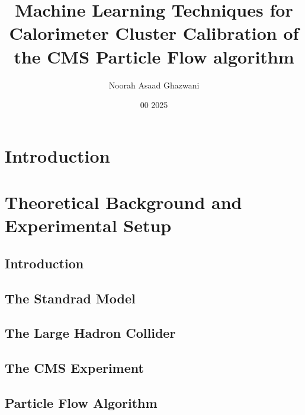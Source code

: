 \documentclass
[
]
{thesis}
\title{Machine Learning Techniques for Calorimeter Cluster Calibration of the CMS Particle Flow algorithm}
\author{Noorah Asaad Ghazwani}
\date{00 2025}
\begin{document}

\setlength{\belowdisplayskip}{1ex} \setlength{\belowdisplayshortskip}{1ex}
\setlength{\abovedisplayskip}{1ex} \setlength{\abovedisplayshortskip}{1ex}


\chapter{Introduction}


\chapter{Theoretical Background and Experimental Setup}
\label{ch2}

\section{Introduction}


\section{The Standrad Model}


\section{The Large Hadron Collider}


\section{The CMS Experiment}


\section{Particle Flow Algorithm}
 
\end{document}

